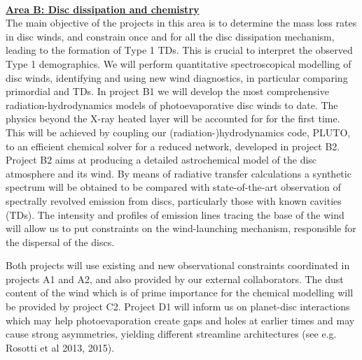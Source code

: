 \documentclass[10pt,fleqn,twoside]{article}
\newcommand{\AreacolB}{\color{Green}}
\begin{document}
%



\
\mbox{}\vspace{1em}\\
\noindent\underline{\bf\AreacolB Area B: Disc dissipation and chemistry }\\
\noindent The main objective of the projects in this area is to
determine the mass loss rates in disc winds, and constrain once and
for all the disc dissipation mechanism, leading to the formation of
Type 1 TDs. This is crucial to interpret the observed Type 1
demographics. We will perform quantitative spectroscopical modelling
of disc winds, identifying and using new wind diagnostics, in
particular comparing primordial and TDs. In project B1 we will develop
the most comprehensive radiation-hydrodynamics models of
photoevaporative disc winds to date. The physics beyond the X-ray
heated layer will be accounted for for the first time. This will be
achieved by coupling our  (radiation-)hydrodynamics code, PLUTO, to an efficient 
chemical solver for a reduced network,
developed in project B2. Project B2 aims at producing a detailed astrochemical model of the
disc atmosphere and its wind. By means of radiative transfer
calculations a synthetic spectrum will be obtained to be compared with
state-of-the-art observation of spectrally revolved emission from
discs, particularly those with known cavities (TDs). The intensity and
profiles of emission lines tracing the base of the wind will allow us
to put constraints on the wind-launching mechanism, responsible for
the dispersal of the discs.  

Both projects will use existing and new observational
constraints coordinated in projects A1 and A2, and also provided by
our external collaborators. The dust 
content of the wind which is of prime importance for the chemical
modelling will be provided by project C2. Project D1 will inform us on
planet-disc
interactions which may help photoevaporation create gaps and holes at
earlier times and may cause 
strong asymmetries, yielding different streamline
architectures (see e.g. Rosotti et al 2013, 2015).\\ 
\end{document}
